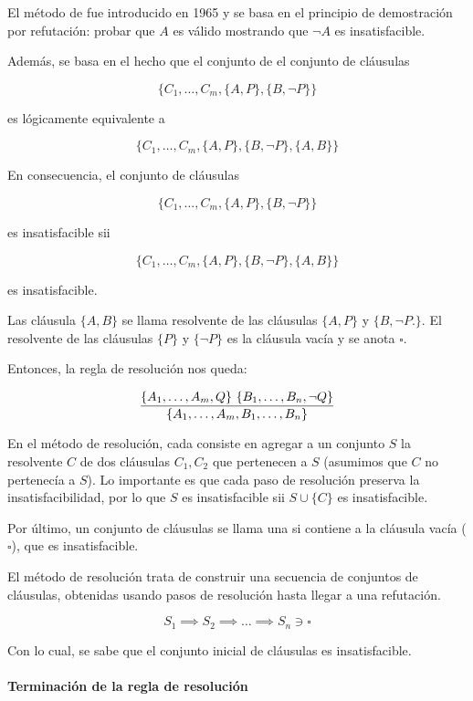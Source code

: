 El método de  fue introducido en 1965 y se basa en el principio de demostración por refutación: probar que $A$ es válido mostrando que $\lnot A$ es insatisfacible.

Además, se basa en el hecho que el conjunto de el conjunto de cláusulas

\[\{C_1, \dots, C_m, \{A,P\}, \{B, \lnot P\}\}\]

es lógicamente equivalente a

\[\{C_1, \dots, C_m, \{A,P\}, \{B, \lnot P\}, \{A,B\}\}\]

En consecuencia, el conjunto de cláusulas

\[\{C_1, \dots, C_m, \{A,P\}, \{B, \lnot P\}\}\]

es insatisfacible sii

\[\{C_1, \dots, C_m, \{A,P\}, \{B, \lnot P\}, \{A,B\}\}\]

es insatisfacible.

Las cláusula $\{A,B\}$ se llama resolvente de las cláusulas $\{A, P\}$ y $\{B, \lnot P.\}$. El resolvente de las cláusulas $\{P\}$ y $\{\lnot P\}$ es la cláusula vacía y se anota $\square$.

Entonces, la regla de resolución nos queda:

\[\resol{\{A_1,\dots,A_m,Q\}\ \{B_1,\dots,B_n,\lnot Q\}}{\{A_1,\dots,A_m, B_1,\dots,B_n\}}\]

En el método de resolución, cada  consiste en agregar a un conjunto $S$ la resolvente $C$ de dos cláusulas $C_1, C_2$ que pertenecen a $S$ (asumimos que $C$ no pertenecía a $S$). Lo importante es que cada paso de resolución preserva la insatisfacibilidad, por lo que $S$ es insatisfacible sii $S \cup \{C\}$ es insatisfacible.

Por último, un conjunto de cláusulas se llama una  si contiene a la cláusula vacía ($\square$), que es insatisfacible.

El método de resolución trata de construir una secuencia de conjuntos de cláusulas, obtenidas usando pasos de resolución hasta llegar a una refutación.

\[S_1 \implies S_2 \implies \dots \implies S_n \ni \square\]

Con lo cual, se sabe que el conjunto inicial de cláusulas es insatisfacible.

\paragraph{Terminación de la regla de resolución}

